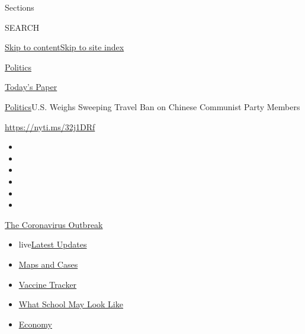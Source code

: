 Sections

SEARCH

\protect\hyperlink{site-content}{Skip to
content}\protect\hyperlink{site-index}{Skip to site index}

\href{https://www.nytimes.com/section/politics}{Politics}

\href{https://myaccount.nytimes.com/auth/login?response_type=cookie\&client_id=vi}{}

\href{https://www.nytimes.com/section/todayspaper}{Today's Paper}

\href{/section/politics}{Politics}\textbar{}U.S. Weighs Sweeping Travel
Ban on Chinese Communist Party Members

\url{https://nyti.ms/32j1DRf}

\begin{itemize}
\item
\item
\item
\item
\item
\item
\end{itemize}

\href{https://www.nytimes.com/news-event/coronavirus?action=click\&pgtype=Article\&state=default\&region=TOP_BANNER\&context=storylines_menu}{The
Coronavirus Outbreak}

\begin{itemize}
\tightlist
\item
  live\href{https://www.nytimes.com/2020/08/01/world/coronavirus-covid-19.html?action=click\&pgtype=Article\&state=default\&region=TOP_BANNER\&context=storylines_menu}{Latest
  Updates}
\item
  \href{https://www.nytimes.com/interactive/2020/us/coronavirus-us-cases.html?action=click\&pgtype=Article\&state=default\&region=TOP_BANNER\&context=storylines_menu}{Maps
  and Cases}
\item
  \href{https://www.nytimes.com/interactive/2020/science/coronavirus-vaccine-tracker.html?action=click\&pgtype=Article\&state=default\&region=TOP_BANNER\&context=storylines_menu}{Vaccine
  Tracker}
\item
  \href{https://www.nytimes.com/interactive/2020/07/29/us/schools-reopening-coronavirus.html?action=click\&pgtype=Article\&state=default\&region=TOP_BANNER\&context=storylines_menu}{What
  School May Look Like}
\item
  \href{https://www.nytimes.com/live/2020/07/31/business/stock-market-today-coronavirus?action=click\&pgtype=Article\&state=default\&region=TOP_BANNER\&context=storylines_menu}{Economy}
\end{itemize}

